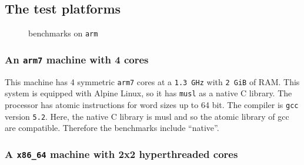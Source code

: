 \subsection{The test platforms}
\label{sec-4-3}
\fi
\begin{figure}[t]
  \caption{benchmarks on \texttt{arm}}
  \label{fig:arm}
\end{figure}
\iflong%
\subsubsection{An \texttt{arm7} machine with 4 cores}
\label{sec-4-3-1}

This machine has 4 symmetric \texttt{arm7} cores at a \texttt{1.3 GHz} with \texttt{2
    GiB} of RAM. This system is equipped with Alpine Linux, so it has
\texttt{musl} as a native C library. The processor has atomic
instructions for word sizes up to 64 bit. The compiler is \texttt{gcc}
version \texttt{5.2}.
%
Here, the native C library is musl and so the atomic library of gcc are
compatible. Therefore the benchmarks include ``native''.


\subsubsection{A \texttt{x86\_64} machine with 2x2 hyperthreaded cores}
\label{sec-4-3-2}

